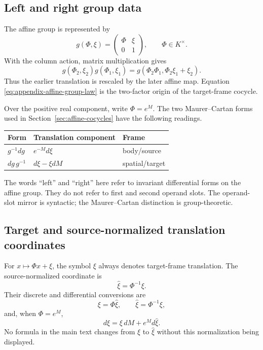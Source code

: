 \subsection{Left and right group data}

The affine group is represented by
\[
  g(\Phi,\xi)=
  \begin{pmatrix}\Phi&\xi\\0&1\end{pmatrix},
  \qquad \Phi\in K^\times.
\]
With the column action, matrix multiplication gives
\begin{equation}
  g(\Phi_2,\xi_2)g(\Phi_1,\xi_1)
  =g(\Phi_2\Phi_1,\Phi_2\xi_1+\xi_2).
  \label{eq:appendix-affine-group-law}
\end{equation}
Thus the earlier translation is rescaled by the later affine map.  Equation
\eqref{eq:appendix-affine-group-law} is the two-factor origin of the
target-frame cocycle.

Over the positive real component, write $\Phi=e^M$.  The two
Maurer--Cartan forms used in Section~\ref{sec:affine-cocycles} have the
following readings.

\begin{center}
\begin{tabular}{lll}
\toprule
Form & Translation component & Frame \\
\midrule
$g^{-1}dg$ & $e^{-M}d\xi$ & body/source \\
$dg\,g^{-1}$ & $d\xi-\xi dM$ & spatial/target \\
\bottomrule
\end{tabular}
\end{center}

The words ``left'' and ``right'' here refer to invariant differential forms on
the affine group.  They do not refer to first and second operand slots.  The
operand-slot mirror is syntactic; the Maurer--Cartan distinction is
group-theoretic.

\subsection{Target and source-normalized translation coordinates}

For $x\mapsto\Phi x+\xi$, the symbol $\xi$ always denotes target-frame
translation.  The source-normalized coordinate is
\[
  \widehat\xi=\Phi^{-1}\xi.
\]
Their discrete and differential conversions are
\[
  \xi=\Phi\widehat\xi,
  \qquad
  \widehat\xi=\Phi^{-1}\xi,
\]
and, when $\Phi=e^M$,
\[
  d\xi=\xi\,dM+e^M d\widehat\xi.
\]
No formula in the main text changes from $\xi$ to $\widehat\xi$ without this
normalization being displayed.

